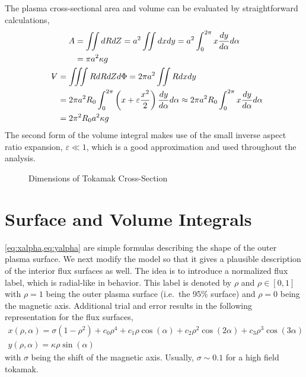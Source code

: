 The plasma cross-sectional area and volume can be evaluated by straightforward calculations,
\begin{gather}
\begin{split}
	A & = \iint dR dZ = a^2 \iint dx dy = a^2 \int_0^{2 \pi} x \frac{dy}{d\alpha} d\alpha \\ & = \pi a^2 \kappa g
\end{split} \\
\begin{split}
	\volume & = \iiint R dR dZ d\Phi = 2 \pi a^2 \iint R dx dy \\ & = 2 \pi a^2 R_0 \int_0^{2 \pi} \left( x + \varepsilon \frac{ x^2 }{ 2} \right) \frac{dy}{d\alpha} d\alpha \approx 2 \pi a^2 R_0 \int_0^{2 \pi} x \frac{dy}{d\alpha} d\alpha \\ & = 2 \pi^2 R_0 a^2 \kappa g
\end{split}
\end{gather}
The second form of the volume integral makes use of the small inverse aspect ratio expansion, $\varepsilon \ll 1 $, which is a good approximation and used throughout the analysis.

\begin{figure}[b]
\centering
\begin{adjustbox}{width=0.6\textwidth}
  \large
  
\end{adjustbox}
\caption{Dimensions of Tokamak Cross-Section}
\end{figure}

\section{Surface and Volume Integrals}

\cref{eq:xalpha,eq:yalpha} are simple formulas describing the shape of the outer plasma surface. We next modify the model so that it gives a plausible description of the interior flux surfaces as well. The idea is to introduce a normalized flux label, which is radial-like in behavior. This label is denoted by $\rho$ and $\rho \in [0,1]$ with $\rho = 1$ being the outer plasma surface (i.e.\ the 95\% surface) and $\rho = 0$ being the magnetic axis. Additional trial and error results in the following representation for the flux surfaces,
\begin{gather}
	x(\rho,\alpha) = \sigma( 1 - \rho^2 ) + c_0 \rho^4 + c_1 \rho \cos(\alpha) + c_2 \rho^2 \cos(2\alpha) +
		c_3 \rho^3 \cos(3\alpha) \\
	y(\rho, \alpha) = \kappa \rho \sin(\alpha)
\end{gather}
with $\sigma$ being the shift of the magnetic axis. Usually, $\sigma \sim 0.1$ for a high field tokamak.

